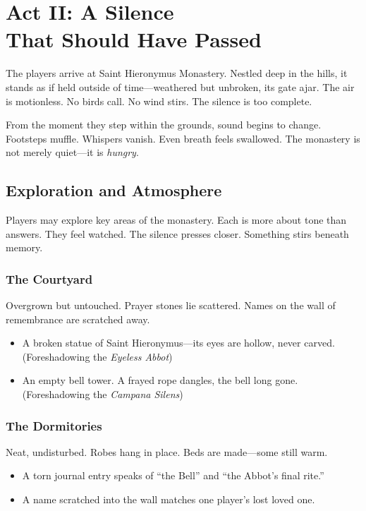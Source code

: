 \newcolumn
\section[Act II: A Silence That Should Have Passed]{Act II: A Silence\\ That Should Have Passed}

The players arrive at Saint Hieronymus Monastery. Nestled deep in the hills, it stands as if held outside of time—weathered but unbroken, its gate ajar. The air is motionless. No birds call. No wind stirs. The silence is too complete.

From the moment they step within the grounds, sound begins to change. Footsteps muffle. Whispers vanish. Even breath feels swallowed. The monastery is not merely quiet—it is \emph{hungry}.

\subsection{Exploration and Atmosphere}

Players may explore key areas of the monastery. Each is more about tone than answers. They feel watched. The silence presses closer. Something stirs beneath memory.

\subsubsection{The Courtyard}
Overgrown but untouched. Prayer stones lie scattered. Names on the wall of remembrance are scratched away.

\begin{Example}{}
    \begin{itemize}
        \item A broken statue of Saint Hieronymus—its eyes are hollow, never carved. (Foreshadowing the \emph{Eyeless Abbot})
        \item An empty bell tower. A frayed rope dangles, the bell long gone. (Foreshadowing the \emph{Campana Silens})
    \end{itemize}
\end{Example}

\subsubsection{The Dormitories}
Neat, undisturbed. Robes hang in place. Beds are made—some still warm.

\begin{Example}{}
    \begin{itemize}
        \item A torn journal entry speaks of “the Bell” and “the Abbot’s final rite.”
        \item A name scratched into the wall matches one player’s lost loved one.
    \end{itemize}
\end{Example}

